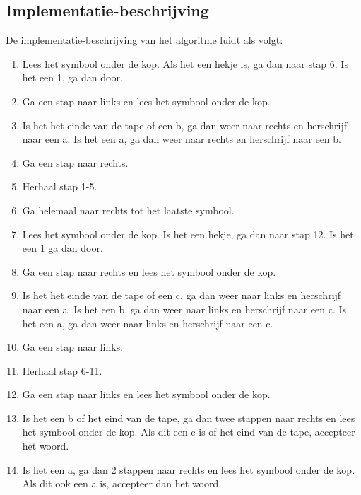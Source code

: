 \documentclass[a4paper]{article}
\begin{document}
\subsection*{Implementatie-beschrijving}
De implementatie-beschrijving van het algoritme luidt als volgt:
\begin{enumerate}
\item Lees het symbool onder de kop. Als het een hekje is, ga dan naar stap 6. Is het een 1, ga dan door.
\item Ga een stap naar links en lees het symbool onder de kop.
\item Is het het einde van de tape of een b, ga dan weer naar rechts en herschrijf naar een a. Is het een a, ga dan weer naar rechts en herschrijf naar een b.
\item Ga een stap naar rechts.
\item Herhaal stap 1-5.
\item Ga helemaal naar rechts tot het laatste symbool.
\item Lees het symbool onder de kop. Is het een hekje, ga dan naar stap 12. Is het een 1 ga dan door.
\item Ga een stap naar rechts en lees het symbool onder de kop.
\item Is het het einde van de tape of een c, ga dan weer naar links en herschrijf naar een a. Is het een b, ga dan weer naar links en herschrijf naar een c. Is het een a, ga dan weer naar links en herschrijf naar een c.
\item Ga een stap naar links.
\item Herhaal stap 6-11.
\item Ga een stap naar links en lees het symbool onder de kop. 
\item Is het een b of het eind van de tape, ga dan twee stappen naar rechts en lees het symbool onder de kop. Als dit een c is of het eind van de tape, accepteer het woord.
\item Is het een a, ga dan 2 stappen naar rechts en lees het symbool onder de kop. Als dit ook een a is, accepteer dan het woord.
\end{enumerate}
\end{document}
